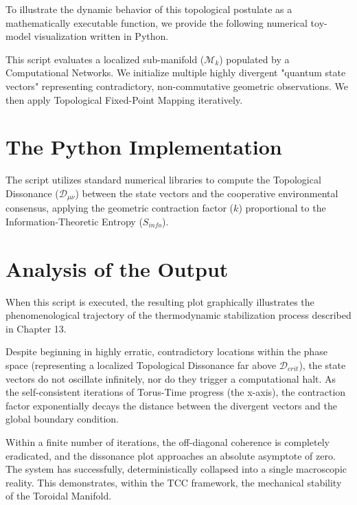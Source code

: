 \documentclass[12pt,openany]{book}
\theoremstyle{plain}
\theoremstyle{definition}
\theoremstyle{remark}
\begin{document}
To illustrate the dynamic behavior of this topological postulate as a mathematically executable function, we provide the following numerical toy-model visualization written in Python. 

This script evaluates a localized sub-manifold ($\mathcal{M}_k$) populated by a Computational Networks. We initialize multiple highly divergent "quantum state vectors" representing contradictory, non-commutative geometric observations. We then apply Topological Fixed-Point Mapping iteratively.

\section{The Python Implementation}

The script utilizes standard numerical libraries to compute the Topological Dissonance ($\mathcal{D}_{\mu\nu}$) between the state vectors and the cooperative environmental consensus, applying the geometric contraction factor ($k$) proportional to the Information-Theoretic Entropy ($S_{info}$).

\begin{center}
\end{center}

\section{Analysis of the Output}

When this script is executed, the resulting plot graphically illustrates the phenomenological trajectory of the thermodynamic stabilization process described in Chapter 13. 

Despite beginning in highly erratic, contradictory locations within the phase space (representing a localized Topological Dissonance far above $\mathcal{D}_{crit}$), the state vectors do not oscillate infinitely, nor do they trigger a computational halt. As the self-consistent iterations of Torus-Time progress (the x-axis), the contraction factor exponentially decays the distance between the divergent vectors and the global boundary condition.

Within a finite number of iterations, the off-diagonal coherence is completely eradicated, and the dissonance plot approaches an absolute asymptote of zero. The system has successfully, deterministically collapsed into a single macroscopic reality. This demonstrates, within the TCC framework, the mechanical stability of the Toroidal Manifold.
\end{document}
